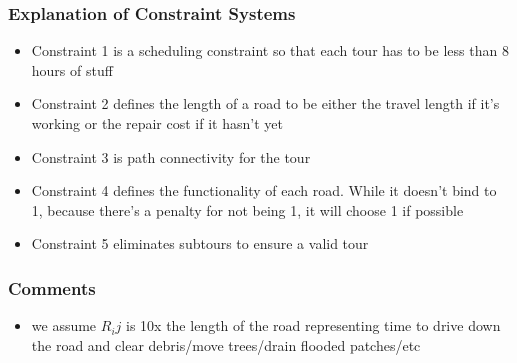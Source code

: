 \documentclass{article}
\begin{document}
	\subsubsection{Explanation of Constraint Systems}
	\begin{itemize}
		\item Constraint 1 is a scheduling constraint so that each tour has to be less than 8 hours of stuff
		\item Constraint 2 defines the length of a road to be either the travel length if it's working or the repair cost if it hasn't yet
		\item Constraint 3 is path connectivity for the tour
		\item Constraint 4 defines the functionality of each road. While it doesn't bind to 1, because there's a penalty for not being 1, it will choose 1 if possible
		\item Constraint 5 eliminates subtours to ensure a valid tour
	\end{itemize}
	\subsubsection{Comments}
	\begin{itemize}
		\item we assume $R_ij$ is 10x the length of the road representing time to drive down the road and clear debris/move trees/drain flooded patches/etc
	\end{itemize}
		
\end{document}

